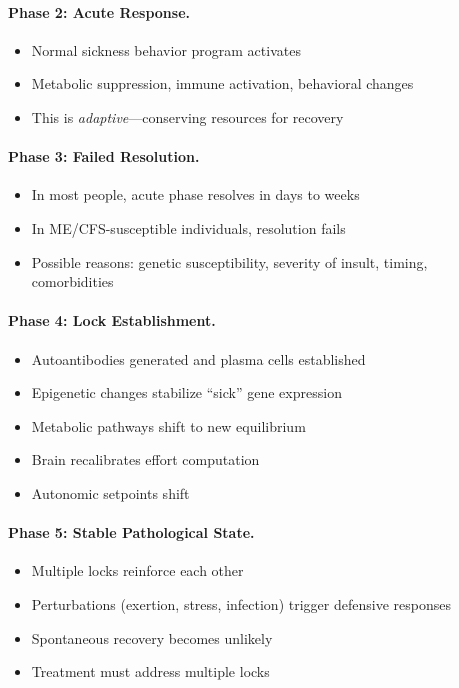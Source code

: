 \paragraph{Phase 2: Acute Response.}
\begin{itemize}
    \item Normal sickness behavior program activates
    \item Metabolic suppression, immune activation, behavioral changes
    \item This is \textit{adaptive}---conserving resources for recovery
\end{itemize}

\paragraph{Phase 3: Failed Resolution.}
\begin{itemize}
    \item In most people, acute phase resolves in days to weeks
    \item In ME/CFS-susceptible individuals, resolution fails
    \item Possible reasons: genetic susceptibility, severity of insult, timing, comorbidities
\end{itemize}

\paragraph{Phase 4: Lock Establishment.}
\begin{itemize}
    \item Autoantibodies generated and plasma cells established
    \item Epigenetic changes stabilize ``sick'' gene expression
    \item Metabolic pathways shift to new equilibrium
    \item Brain recalibrates effort computation
    \item Autonomic setpoints shift
\end{itemize}

\paragraph{Phase 5: Stable Pathological State.}
\begin{itemize}
    \item Multiple locks reinforce each other
    \item Perturbations (exertion, stress, infection) trigger defensive responses
    \item Spontaneous recovery becomes unlikely
    \item Treatment must address multiple locks
\end{itemize}

